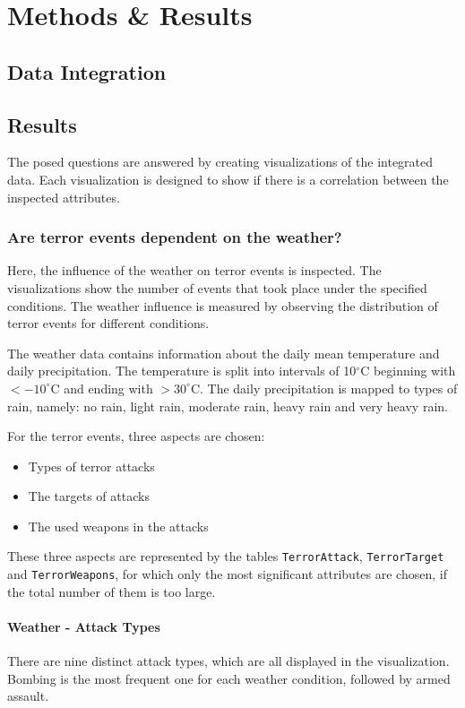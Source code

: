 \section{Methods \& Results}
\subsection{Data Integration}

\subsection{Results}
The posed questions are answered by creating visualizations of the integrated data. Each visualization is designed to show if there is a correlation between the inspected attributes.

\subsubsection{Are terror events dependent on the weather?}
Here, the influence of the weather on terror events is inspected. The visualizations show the number of events that took place under the specified conditions. The weather influence is measured by observing the distribution of terror events for different conditions.

The weather data contains information about the daily mean temperature and daily precipitation. The temperature is split into intervals of 10$^\circ$C beginning with $< -10^\circ$C and ending with $> 30^\circ$C. The daily precipitation is mapped to types of rain, namely: no rain, light rain, moderate rain, heavy rain and very heavy rain.

For the terror events, three aspects are chosen:
\begin{itemize}
	\item Types of terror attacks
	\item The targets of attacks
	\item The used weapons in the attacks
\end{itemize}

These three aspects are represented by the tables \texttt{TerrorAttack}, \texttt{TerrorTarget} and \texttt{TerrorWeapons}, for which only the most significant attributes are chosen, if the total number of them is too large.

\paragraph{Weather - Attack Types}
There are nine distinct attack types, which are all displayed in the visualization. Bombing is the most frequent one for each weather condition, followed by armed assault.

